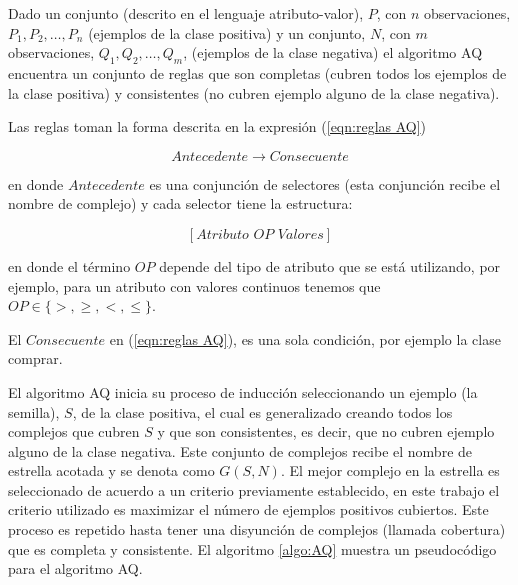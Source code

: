 \documentclass[12pt]{report}
\theoremstyle{break}
\theoremstyle{break}
\begin{document}
Dado un conjunto (descrito en el lenguaje atributo-valor), $P$, con $n$ observaciones, $P_1, P_2, \ldots, P_n$ (ejemplos de la clase positiva)  y un conjunto, $N$, con $m$ observaciones, $Q_1, Q_2, \ldots, Q_m$, (ejemplos de la clase negativa) el algoritmo AQ encuentra un conjunto de reglas que son completas (cubren todos los ejemplos de la clase positiva) y consistentes (no cubren ejemplo alguno de la clase negativa).

Las reglas toman la forma descrita en la expresión (\ref{eqn:reglas AQ})

\begin{equation} \label{eqn:reglas AQ}
Antecedente \rightarrow Consecuente
\end{equation}

en donde $Antecedente$ es una conjunción de selectores (esta conjunción recibe el nombre de complejo) y cada selector tiene la estructura:

\begin{equation} \label{eqn:condicion AQ}
\left[Atributo\,\, OP\,\, Valores \right]
\end{equation}

en donde el término $OP$ depende del tipo de atributo que se está utilizando, por ejemplo, para un atributo con valores continuos tenemos que $OP \in \{>, \geq, <, \leq\}$.

El $Consecuente$ en (\ref{eqn:reglas AQ}), es una sola condición, por ejemplo la clase comprar.

El algoritmo AQ inicia su proceso de inducción seleccionando un ejemplo (la semilla), $S$, de la clase positiva, el cual es generalizado creando todos los complejos que cubren $S$ y que son consistentes, es decir, que no cubren ejemplo alguno de la clase negativa. Este conjunto de complejos recibe el nombre de estrella acotada y se denota como $G(S,N)$. El mejor complejo en la estrella es seleccionado de acuerdo a un criterio previamente establecido, en este trabajo el criterio utilizado es maximizar el número de ejemplos positivos cubiertos. Este proceso es repetido hasta tener una disyunción de complejos (llamada cobertura) que es completa y consistente. El algoritmo \ref{algo:AQ} muestra un pseudocódigo para el algoritmo AQ.
\end{document}
